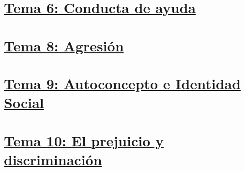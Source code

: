\documentclass[
]{book}
\begin{document}
\chapter{\texorpdfstring{\href{https://dalarconrub.github.io/psicologia-social-tema-6/}{Tema 6: Conducta de ayuda}}{Tema 6: Conducta de ayuda}}\label{tema-6-conducta-de-ayuda}

\chapter{\texorpdfstring{\href{https://dalarconrub.github.io/psicologia-social-tema-8/}{Tema 8: Agresión}}{Tema 8: Agresión}}\label{tema-8-agresiuxf3n}

\chapter{\texorpdfstring{\href{https://dalarconrub.github.io/psicologia-social-tema-9/}{Tema 9: Autoconcepto e Identidad Social}}{Tema 9: Autoconcepto e Identidad Social}}\label{tema-9-autoconcepto-e-identidad-social}

\chapter{\texorpdfstring{\href{https://dalarconrub.github.io/psicologia-social-tema-10/}{Tema 10: El prejuicio y discriminación}}{Tema 10: El prejuicio y discriminación}}\label{tema-10-el-prejuicio-y-discriminaciuxf3n}
\end{document}
